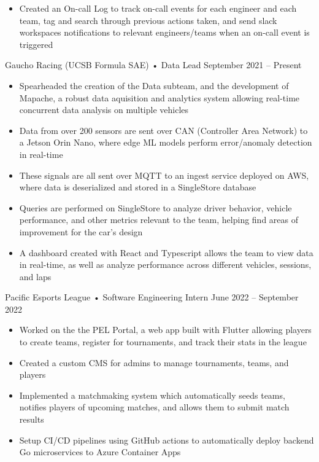 \documentclass[9pt]{developercv} %
\begin{document}
\begin{entrylist}
{\begin{itemize}[noitemsep,topsep=0pt,parsep=0pt,partopsep=0pt, leftmargin=10pt]
            \item Created an On-call Log to track on-call events for each engineer and each team, tag and search through previous actions taken, and send slack workspaces notifications to relevant engineers/teams when an on-call event is triggered
        \end{itemize}}
    \entry
		{}
		{Gaucho Racing (UCSB Formula SAE) • Data Lead}
		{September 2021 – Present}
		{\vspace{-8pt}
        \begin{itemize}[noitemsep,topsep=0pt,parsep=0pt,partopsep=0pt, leftmargin=10pt]
            \item Spearheaded the creation of the Data subteam, and the development of Mapache, a robust data aquisition and analytics system allowing real-time concurrent data analysis on multiple vehicles
            \item Data from over 200 sensors are sent over CAN (Controller Area Network) to a Jetson Orin Nano, where edge ML models perform error/anomaly detection in real-time
            \item These signals are all sent over MQTT to an ingest service deployed on AWS, where data is deserialized and stored in a SingleStore database
            \item Queries are performed on SingleStore to analyze driver behavior, vehicle performance, and other metrics relevant to the team, helping find areas of improvement for the car's design
            \item A dashboard created with React and Typescript allows the team to view data in real-time, as well as analyze performance across different vehicles, sessions, and laps
        \end{itemize}}
	\entry
		{}
		{Pacific Esports League • Software Engineering Intern}
		{June 2022 – September 2022}
		{\vspace{-8pt}
        \begin{itemize}[noitemsep,topsep=0pt,parsep=0pt,partopsep=0pt, leftmargin=10pt]
            \item Worked on the the PEL Portal, a web app built with Flutter allowing players to create teams, register for tournaments, and track their stats in the league
            \item Created a custom CMS for admins to manage tournaments, teams, and players
            \item Implemented a matchmaking system which automatically seeds teams, notifies players of upcoming matches, and allows them to submit match results
            \item Setup CI/CD pipelines using GitHub actions to automatically deploy backend Go microservices to Azure Container Apps
        \end{itemize}}
\end{entrylist}
\vspace{-10pt}
\end{document}
